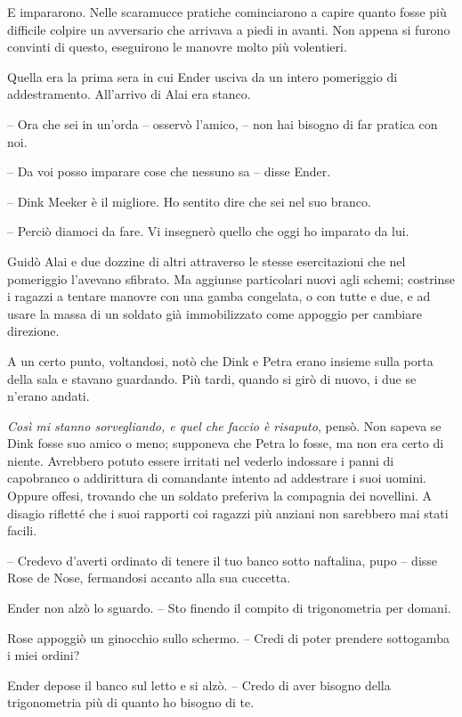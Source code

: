 {E impararono. Nelle scaramucce pratiche cominciarono a capire quanto
	fosse più difficile colpire un avversario che arrivava a piedi in
	avanti. Non appena si furono convinti di questo, eseguirono le manovre
	molto più volentieri.}

{Quella era la prima sera in cui Ender usciva da un intero pomeriggio di
	addestramento. All'arrivo di Alai era stanco.}

{-- Ora che sei in un'orda -- osservò l'amico, -- non hai bisogno di far
	pratica con noi.}

{-- Da voi posso imparare cose che nessuno sa -- disse Ender.}

{-- Dink Meeker è il migliore. Ho sentito dire che sei nel suo branco.}

{-- Perciò diamoci da fare. Vi insegnerò quello che oggi ho imparato da
	lui.}

{Guidò Alai e due dozzine di altri attraverso le stesse esercitazioni
	che nel pomeriggio l'avevano sfibrato. Ma aggiunse particolari nuovi
	agli schemi; costrinse i ragazzi a tentare manovre con una gamba
	congelata, o con tutte e due, e ad usare la massa di un soldato già
	immobilizzato come appoggio per cambiare direzione.}

{A un certo punto, voltandosi, notò che Dink e Petra erano insieme sulla
	porta della sala e stavano guardando. Più tardi, quando si girò di
	nuovo, i due se n'erano andati.}

\emph{{Così mi stanno sorvegliando, e quel che faccio è risaputo}}{,
	\emph{} pensò. Non sapeva se Dink fosse suo amico o meno; supponeva che
	Petra lo fosse, ma non era certo di niente. Avrebbero potuto essere
	irritati nel vederlo indossare i panni di capobranco o addirittura di
	comandante intento ad addestrare i suoi uomini. Oppure offesi, trovando
	che un soldato preferiva la compagnia dei novellini. A disagio rifletté
	che i suoi rapporti coi ragazzi più anziani non sarebbero mai stati
	facili.}

{-- Credevo d'averti ordinato di tenere il tuo banco sotto naftalina,
	pupo -- disse Rose de Nose, fermandosi accanto alla sua cuccetta.}

{Ender non alzò lo sguardo. -- Sto finendo il compito di trigonometria
	per domani.}

{Rose appoggiò un ginocchio sullo schermo. -- Credi di poter prendere
	sottogamba i miei ordini?}

{Ender depose il banco sul letto e si alzò. -- Credo di aver bisogno
	della trigonometria più di quanto ho bisogno di te.}

